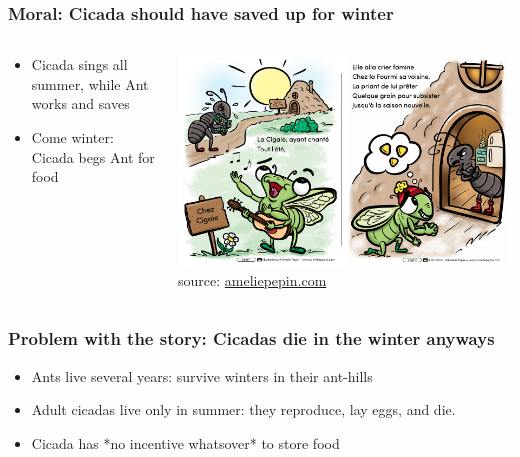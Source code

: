 \documentclass[aspectratio=169]{beamer}
\begin{document}
\begin{frame}[label=top]
    \frametitle{\Large{Moral: Cicada should have saved up for winter}}
    \begin{columns}
    \begin{column}{0.4\textwidth}
        \begin{itemize}
            \item Cicada sings all summer, while Ant works and saves 
            \item Come winter: Cicada begs Ant for food
        \end{itemize}
    \end{column}
    \begin{column}{0.6\textwidth}  %
    \begin{center}
    \includegraphics[scale=0.40]{pics/cigaleFourmi2.png}
    {\tiny source: \href{https://www.ameliepepin.com/}{ameliepepin.com}}
    \end{center}
\end{column}
\end{columns}
\end{frame}  

\begin{frame}[label=top]
    \frametitle{\Large{Problem with the story: Cicadas die in the winter anyways}}
    \begin{itemize}
        \item Ants live several years: survive winters in their ant-hills
        \item Adult cicadas live only in summer: they reproduce, lay eggs, and die.  
        \item Cicada has *no incentive whatsover* to store food
    \end{itemize}
\end{frame}  
\end{document}
